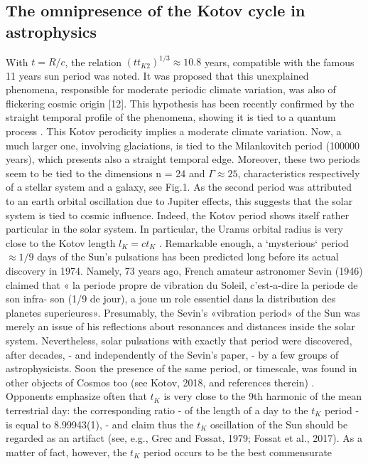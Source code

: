 \documentclass[twoside,draft]{article}
\begin{document}
\begin{sloppypar}
{\subsection{The omnipresence of the Kotov cycle in astrophysics}

With $t = R/c$, the relation $(t t_{K2} )^{1/3} \approx 10.8$ years, compatible with the famous 11 years sun period
was noted. It was proposed that this unexplained phenomena, responsible for moderate periodic
climate variation, was also of flickering cosmic origin [12]. This hypothesis has been recently
confirmed by the straight temporal profile of the phenomena, showing it is tied to a quantum
process \cite{Kotov}.
This Kotov perodicity implies a moderate climate variation. Now, a much larger one, involving
glaciations, is tied to the Milankovitch period (100000 years), which presents also a straight
temporal edge. Moreover, these two periods seem to be tied to the dimensions n = 24 and $\Gamma \approx 25$,
characteristics respectively of a stellar system and a galaxy, see Fig.1. As the second period was
attributed to an earth orbital oscillation due to Jupiter effects, this suggests that the solar system is
tied to cosmic influence. Indeed, the Kotov period shows itself rather particular in the solar system.
In particular, the Uranus orbital radius is very close to the Kotov length $l_{K} = ct_{K}$ .
Remarkable enough, a `mysterious` period $\approx 1/9$ days of the Sun's pulsations has been predicted
long before its actual discovery in 1974. Namely, 73 years ago, French amateur astronomer Sevin
(1946) claimed that « la periode propre de vibration du Soleil, c'est-a-dire la periode de son infra-
son (1/9 de jour), a joue un role essentiel dans la distribution des planetes superieures». Presumably,
the Sevin's «vibration period» of the Sun was merely an issue of his reflections about resonances
and distances inside the solar system. Nevertheless, solar pulsations with exactly that period were
discovered, after decades, - and independently of the Sevin's paper, - by a few groups of
astrophysicists. Soon the presence of the same period, or timescale, was found in other objects of
Cosmos too (see Kotov, 2018, and references therein) .
Opponents emphasize often that $t_{K}$ is very close to the 9th harmonic of the mean terrestrial day: the corresponding ratio - of the length of a day to the $t_{K}$ period - is equal to 8.99943(1), - and claim
thus the $t_{K}$ oscillation of the Sun should be regarded as an artifact (see, e.g., Grec and Fossat, 1979;
Fossat et al., 2017). As a matter of fact, however, the $t_{K}$ period occurs to be the best commensurate
}
\end{sloppypar}
\end{document}

